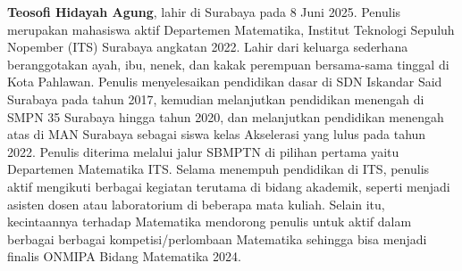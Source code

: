 \documentclass{file/KP-ITS}
\theoremstyle{definition}
\theoremstyle{definition}
\theoremstyle{plain}
\begin{document}
\cleardoublepage
{}
\textbf{Teosofi Hidayah Agung}, lahir di Surabaya pada 8 Juni 2025. Penulis merupakan mahasiswa aktif Departemen Matematika, Institut Teknologi Sepuluh Nopember (ITS) Surabaya angkatan 2022. Lahir dari keluarga sederhana beranggotakan ayah, ibu, nenek, dan kakak perempuan bersama-sama tinggal di Kota Pahlawan. Penulis menyelesaikan pendidikan dasar di SDN Iskandar Said Surabaya pada tahun 2017, kemudian melanjutkan pendidikan menengah di SMPN 35 Surabaya hingga tahun 2020, dan melanjutkan pendidikan menengah atas di MAN Surabaya sebagai siswa kelas Akselerasi yang lulus pada tahun 2022. Penulis diterima melalui jalur SBMPTN di pilihan pertama yaitu Departemen Matematika ITS. Selama menempuh pendidikan di ITS, penulis aktif mengikuti berbagai kegiatan terutama di bidang akademik, seperti menjadi asisten dosen atau laboratorium di beberapa mata kuliah. Selain itu, kecintaannya terhadap Matematika mendorong penulis untuk aktif dalam berbagai berbagai kompetisi/perlombaan Matematika sehingga bisa menjadi finalis ONMIPA Bidang Matematika 2024.
\end{document}
